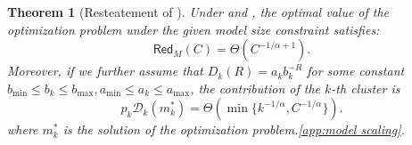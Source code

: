 \documentclass[11pt]{article}
\theoremstyle{plain}
\newtheorem{theorem}{Theorem}[section]
\theoremstyle{definition}
\newcommand{\capacity}{C}
\newcommand{\ratedistortion}{\mathcal{D}}
\newcommand{\testmodelerror}{\mathsf{Red}_M}
\newcommand{\jian}[1]{{\it \color{red}{Jian: #1}}}
\newcommand{\zhixuan}[1]{{\it \color{blue}{zhixuan: #1}}}
\begin{document}
  
\begin{theorem}[Resteatement of ]
Under  and , the optimal value of the optimization problem under the given model size constraint satisfies:
\[\testmodelerror(\capacity) = \Theta(\capacity^{-1/\alpha+1}).\] 
Moreover, if we further assume that $D_k(R)=a_kb_k^{-R}$ for some constant $b_{\min}\le b_k\le b_{\max},a_{\min}\le a_k\le a_{\max}$,  
the contribution of the $k$-th cluster is
\[
p_k\ratedistortion_k(m_k^*)=\Theta(\min\{k^{-1/\alpha},C^{-1/\alpha}\}).
\]
where $m_k^*$ is the solution of the optimization problem.\eqref{app:model scaling}.
\end{theorem}
\end{document}
